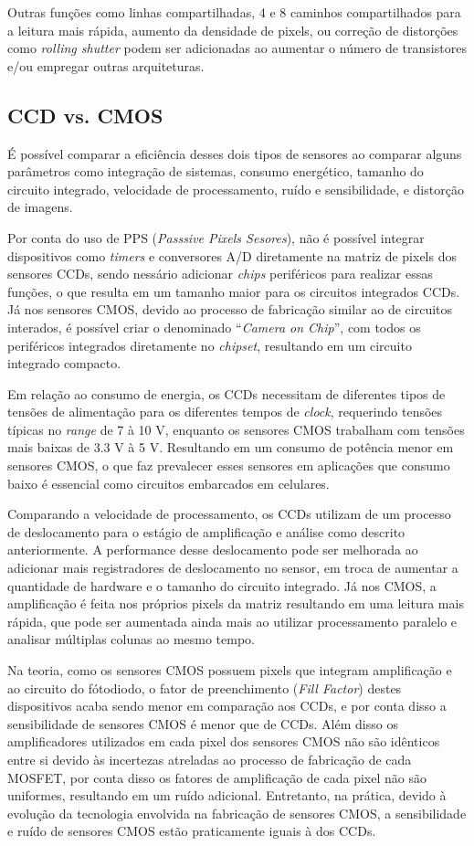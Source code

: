 \documentclass[10pt,a4paper,twocolumn]{article}
\begin{document}
	Outras funções como linhas compartilhadas, 4 e 8 caminhos compartilhados para a leitura mais rápida, aumento da densidade de pixels, ou correção de distorções como \textit{rolling shutter} podem ser adicionadas ao aumentar o número de transistores e/ou empregar outras arquiteturas.
	
	\subsection*{CCD vs. CMOS}
	É possível comparar a eficiência desses dois tipos de sensores ao comparar alguns parâmetros como integração de sistemas, consumo energético, tamanho do circuito integrado, velocidade de processamento, ruído e sensibilidade, e distorção de imagens.
	
	Por conta do uso de PPS (\textit{Passsive Pixels Sesores}), não é possível integrar dispositivos como \textit{timers} e conversores A/D diretamente na matriz de pixels dos sensores CCDs, sendo nessário adicionar \textit{chips} periféricos para realizar essas funções, o que resulta em um tamanho maior para os circuitos integrados CCDs. Já nos sensores CMOS, devido ao processo de fabricação similar ao de circuitos interados, é possível criar o denominado ``\textit{Camera on Chip}'', com todos os periféricos integrados diretamente no \textit{chipset}, resultando em um circuito integrado compacto.
	
	Em relação ao consumo de energia, os CCDs necessitam de diferentes tipos de tensões de alimentação para os diferentes tempos de \textit{clock}, requerindo tensões típicas no \textit{range} de 7 à 10 V, enquanto os sensores CMOS trabalham com tensões mais baixas de 3.3 V à 5 V. Resultando em um consumo de potência menor em sensores CMOS, o que faz prevalecer esses sensores em aplicações que consumo baixo é essencial como circuitos embarcados em celulares.
	
	Comparando a velocidade de processamento, os CCDs utilizam de um processo de deslocamento para o estágio de amplificação e análise como descrito anteriormente. A performance desse deslocamento pode ser melhorada ao adicionar mais registradores de deslocamento no sensor, em troca de aumentar a quantidade de hardware e o tamanho do circuito integrado. Já nos CMOS, a amplificação é feita nos próprios pixels da matriz resultando em uma leitura mais rápida, que pode ser aumentada ainda mais ao utilizar processamento paralelo e analisar múltiplas colunas ao mesmo tempo.
	
	Na teoria, como os sensores CMOS possuem pixels que integram amplificação e ao circuito do fótodiodo, o fator de preenchimento (\textit{Fill Factor}) destes dispositivos acaba sendo menor em comparação aos CCDs, e por conta disso a sensibilidade de sensores CMOS é menor que de CCDs. Além disso os amplificadores utilizados em cada pixel dos sensores CMOS não são idênticos entre si devido às incertezas atreladas ao processo de fabricação de cada MOSFET, por conta disso os fatores de amplificação de cada pixel não são uniformes, resultando em um ruído adicional. Entretanto, na prática, devido à evolução da tecnologia envolvida na fabricação de sensores CMOS, a sensibilidade e ruído de sensores CMOS estão praticamente iguais à dos CCDs.
	
\end{document}
